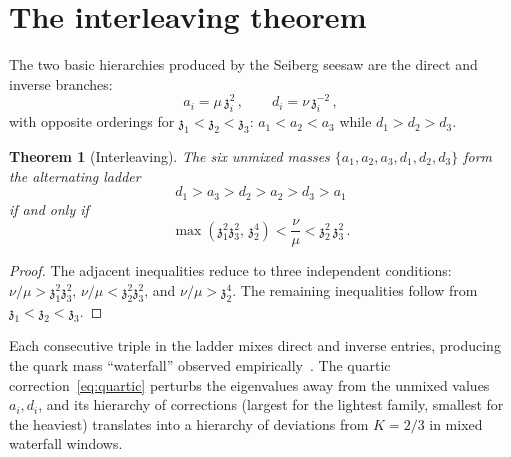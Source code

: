 \documentclass[aps,prd,twocolumn,showpacs,preprintnumbers,superscriptaddress,floatfix]{revtex4-2}
\newtheorem{theorem}{Theorem}
\newcommand{\zch}{\mathfrak{z}}
\begin{document}
\section{The interleaving theorem}
\label{app:interleaving}

The two basic hierarchies produced by the Seiberg seesaw are the
direct and inverse branches:
\begin{equation}
  a_i = \mu\,\zch_i^2\,,
  \qquad
  d_i = \nu\,\zch_i^{-2}\,,
\end{equation}
with opposite orderings for $\zch_1 < \zch_2 < \zch_3$:
$a_1 < a_2 < a_3$ while $d_1 > d_2 > d_3$.

\begin{theorem}[Interleaving]
\label{thm:interleaving}
The six unmixed masses $\{a_1, a_2, a_3, d_1, d_2, d_3\}$
form the alternating ladder
\begin{equation}
  d_1 > a_3 > d_2 > a_2 > d_3 > a_1
\end{equation}
if and only if
\begin{equation}
  \max(\zch_1^2 \zch_3^2,\, \zch_2^4)
  < \frac{\nu}{\mu}
  < \zch_2^2\,\zch_3^2\,.
  \label{eq:window}
\end{equation}
\end{theorem}

\begin{proof}
The adjacent inequalities reduce to three independent conditions:
$\nu/\mu > \zch_1^2\zch_3^2$,
$\nu/\mu < \zch_2^2\zch_3^2$, and
$\nu/\mu > \zch_2^4$.
The remaining inequalities follow from
$\zch_1 < \zch_2 < \zch_3$.
\end{proof}

Each consecutive triple in the ladder mixes direct and inverse
entries, producing the quark mass ``waterfall'' observed
empirically~\cite{Zenczykowski:2012}.
The quartic correction~\eqref{eq:quartic} perturbs the eigenvalues
away from the unmixed values $a_i, d_i$, and its hierarchy of
corrections (largest for the lightest family, smallest for the
heaviest) translates into a hierarchy of deviations from $K = 2/3$
in mixed waterfall windows.
\end{document}
